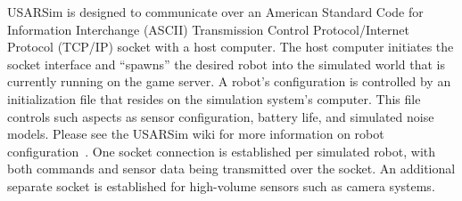 USARSim is designed to communicate over an American Standard Code for Information Interchange (ASCII) Transmission Control Protocol/Internet Protocol (TCP/IP) socket with a host computer. The host computer initiates the socket interface and ``spawns'' the desired robot into the simulated world that is currently running on the game server. A robot's configuration is controlled by an initialization file that resides on the simulation system's computer. This file controls such aspects as sensor configuration, battery life, and simulated noise models. Please see the USARSim wiki for more information on robot configuration~\cite{USARSimWeb}.  One socket connection is established per simulated robot, with both commands and sensor data being transmitted over the socket. An additional separate socket is established for high-volume sensors such as camera systems.

